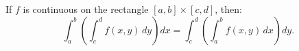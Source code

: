 If $f$ is continuous on the rectangle $[a, b] \times [c, d]$, then:
\[
\int_a^b \left( \int_c^d f(x, y)\,dy \right) dx = \int_c^d \left( \int_a^b f(x, y)\,dx \right) dy.
\]
